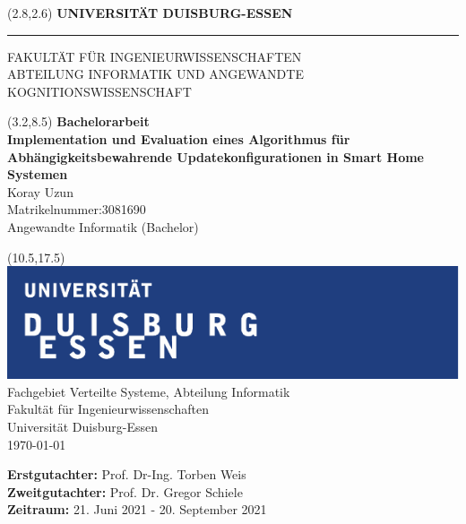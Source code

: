 \begin{titlepage}
\vspace*{-1cm}
\newlength{\links}
\setlength{\links}{0.9cm}
\setlength{\TPHorizModule}{1cm}
\setlength{\TPVertModule}{1cm}
\textblockorigin{0pt}{0pt}

\sffamily
\LARGE

\begin{textblock}{16.5}(2.8,2.6)
 \hspace*{-0.25cm} \textbf{UNIVERSITÄT DUISBURG-ESSEN} \\
 \hspace*{-1.15cm} \rule{5mm}{5mm} \hspace*{0.05cm} FAKULTÄT FÜR INGENIEURWISSENSCHAFTEN\\
 \large{}ABTEILUNG INFORMATIK UND ANGEWANDTE KOGNITIONSWISSENSCHAFT\\
\end{textblock}


\begin{textblock}{14.5}(3.2,8.5)
  \large
{ \textbf{Bachelorarbeit}} \\[1cm]
{\LARGE \Large\textbf{Implementation und Evaluation eines Algorithmus für Abhängigkeitsbewahrende Updatekonfigurationen in Smart Home Systemen}} \\[1.3cm]
Koray Uzun\\
Matrikelnummer:3081690\\
Angewandte Informatik (Bachelor)
\end{textblock}



\begin{textblock}{10}(10.5,17.5)
\includegraphics[scale=1.0]{images/unilogo.pdf}\\
\normalsize
\raggedleft
Fachgebiet Verteilte Systeme, Abteilung Informatik \\
Fakultät für Ingenieurwissenschaften \\
Universität Duisburg-Essen \\[2ex]

\today\\[15ex]
\raggedright
{\textbf{Erstgutachter:}} Prof. Dr-Ing. Torben Weis \\
{\textbf{Zweitgutachter:}} Prof. Dr. Gregor Schiele \\
{\textbf{Zeitraum:}} 21. Juni 2021 - 20. September 2021 \\
\end{textblock}

\end{titlepage}
